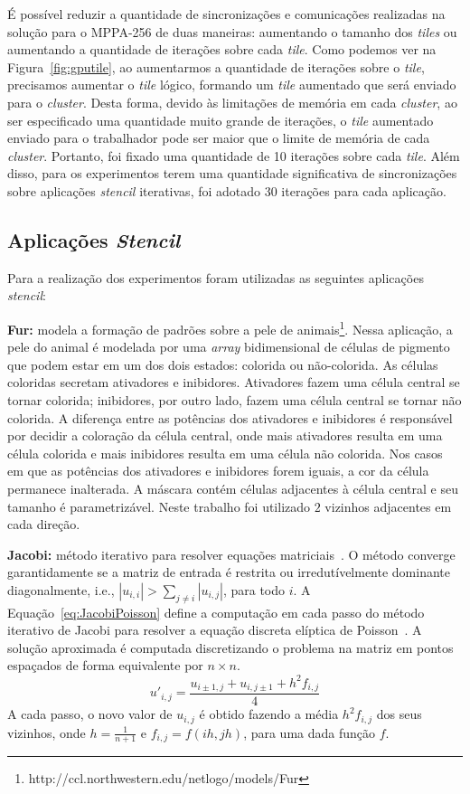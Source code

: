 \documentclass[12pt]{article}
\newcommand{\mppa}{MPPA-256\xspace}
\newcommand{\stencil}{\textit{stencil}\xspace}
\begin{document}
É possível reduzir a quantidade de sincronizações e comunicações realizadas na
solução para o \mppa de duas maneiras: aumentando o tamanho dos \textit{tiles}
ou aumentando a quantidade de iterações sobre cada \textit{tile}. Como podemos
ver na Figura~\ref{fig:gputile}, ao aumentarmos a quantidade de iterações sobre
o \textit{tile}, precisamos aumentar o \textit{tile} lógico, formando um
\textit{tile} aumentado que será enviado para o \textit{cluster}. Desta forma,
devido às limitações de memória em cada \textit{cluster}, ao ser especificado
uma quantidade muito grande de iterações, o \textit{tile} aumentado enviado para
o trabalhador pode ser maior que o limite de memória de cada \textit{cluster}.
Portanto, foi fixado uma quantidade de 10 iterações sobre cada \textit{tile}.
Além disso, para os experimentos terem uma quantidade significativa de
sincronizações sobre aplicações \stencil iterativas, foi adotado 30 iterações
para cada aplicação.

\subsection{Aplicações \textit{Stencil}}

Para a realização dos experimentos foram utilizadas as seguintes aplicações \stencil:

\textbf{Fur:} modela a formação de padrões sobre a pele de
animais\footnote{{http://ccl.northwestern.edu/netlogo/models/Fur}}. Nessa
aplicação, a pele do animal é modelada por uma \textit{array} bidimensional de
células de pigmento que podem estar em um dos dois estados: colorida ou
não-colorida. As células coloridas secretam ativadores e inibidores. Ativadores
fazem uma célula central se tornar colorida; inibidores, por outro lado, fazem
uma célula central se tornar não colorida.
A diferença entre as potências dos ativadores e inibidores é responsável por
decidir a coloração da célula central, onde mais ativadores resulta em uma
célula colorida e mais inibidores resulta em uma célula não colorida. Nos casos
em que as potências dos ativadores e inibidores forem iguais, a cor da célula
permanece inalterada. A máscara contém células adjacentes à célula central e seu
tamanho é parametrizável. Neste trabalho foi utilizado $2$ vizinhos adjacentes
em cada direção.

\textbf{Jacobi:} método iterativo para resolver equações matriciais~\cite{demmel97}.
O método converge garantidamente se a matriz de entrada é restrita ou irredutívelmente dominante diagonalmente, i.e., $|u_{i,i}| > \sum_{j\neq i}{|u_{i,j}|}$, para todo $i$.
A Equação~\ref{eq:JacobiPoisson} define a computação em cada passo do método
iterativo de Jacobi para resolver a equação discreta elíptica de
Poisson~\cite{demmel97}. A solução aproximada é computada discretizando o
problema na matriz em pontos espaçados de forma equivalente por $n\times n$.\\
 \begin{equation}
 u'_{i,j} = \frac{u_{i\pm1,j} + u_{i,j\pm1} + h^2f_{i,j}}{4}
 \label{eq:JacobiPoisson}
 \end{equation}
 A cada passo, o novo valor de $u_{i,j}$ é obtido fazendo a média $h^2f_{i,j}$ dos seus vizinhos, onde $h = \frac{1}{n+1}$ e $f_{i,j} = f(ih,jh)$,
 para uma dada função $f$.
\end{document}
